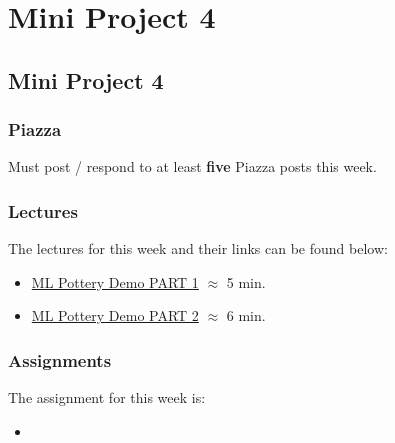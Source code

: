 \clearpage

\renewcommand{\ChapTitle}{Mini Project 4}
\renewcommand{\SectionTitle}{Mini Project 4}

\chapter{\ChapTitle}
\section{\SectionTitle}

\subsection{Piazza}

Must post / respond to at least \textbf{five} Piazza posts this week.

\subsection{Lectures}

The lectures for this week and their links can be found below:

\begin{itemize}
    \item \href{https://applied.cs.colorado.edu/mod/hvp/view.php?id=49426}{ML Pottery Demo PART 1} $\approx$ 5 min.
    \item \href{https://applied.cs.colorado.edu/mod/hvp/view.php?id=49427}{ML Pottery Demo PART 2} $\approx$ 6 min.
\end{itemize}

\subsection{Assignments}

The assignment for this week is:

\begin{itemize}
    \item {}
\end{itemize}